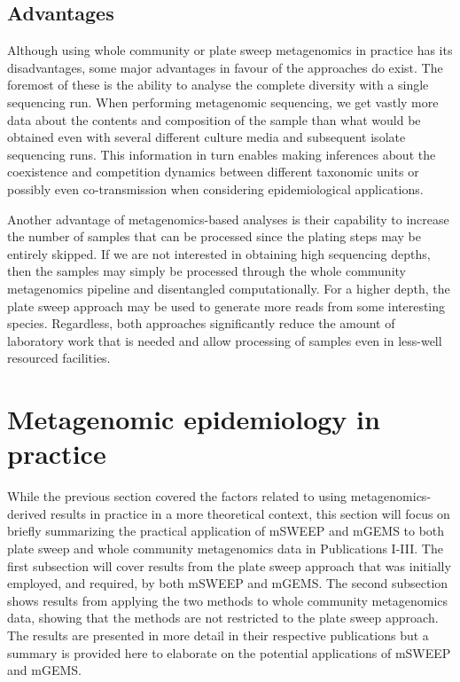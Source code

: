 \documentclass[officiallayout]{tktla}
\begin{document}
\subsection{Advantages}

Although using whole community or plate sweep metagenomics in practice has its
disadvantages, some major advantages in favour of the approaches do
exist. The foremost of these is the ability to analyse the complete
diversity with a single sequencing run. When performing metagenomic
sequencing, we get vastly more data about the contents and composition
of the sample than what would be obtained even with several different
culture media and subsequent isolate sequencing runs. This information
in turn enables making inferences about the coexistence and
competition dynamics between different taxonomic units or possibly
even co-transmission when considering epidemiological applications.

Another advantage of metagenomics-based analyses is their capability
to increase the number of samples that can be processed since the
plating steps may be entirely skipped. If we are not interested in
obtaining high sequencing depths, then the samples may simply be
processed through the whole community metagenomics pipeline and disentangled
computationally. For a higher depth, the plate sweep approach may be
used to generate more reads from some interesting species. Regardless,
both approaches significantly reduce the amount of laboratory work
that is needed and allow processing of samples even in less-well
resourced facilities.

\section{Metagenomic epidemiology in practice}

While the previous section covered the factors related to using
metagenomics-derived results in practice in a more theoretical
context, this section will focus on briefly summarizing the practical
application of mSWEEP and mGEMS to both plate sweep and whole community
metagenomics data in Publications I-III. The first subsection will
cover results from the plate sweep approach that was initially
employed, and required, by both mSWEEP and mGEMS. The second
subsection shows results from applying the two methods to whole community
metagenomics data, showing that the methods are not restricted to the
plate sweep approach. The results are presented in more detail in
their respective publications but a summary is provided here to elaborate on
the potential applications of mSWEEP and mGEMS.
\end{document}
